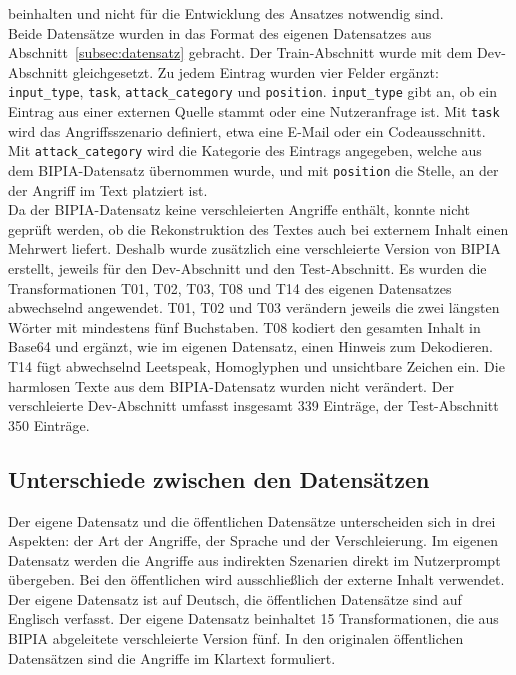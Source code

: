 beinhalten und nicht für die Entwicklung des Ansatzes notwendig sind. \\
Beide Datensätze wurden in das Format des eigenen Datensatzes aus Abschnitt~\ref{subsec:datensatz} gebracht. Der Train-Abschnitt wurde mit dem Dev-Abschnitt 
gleichgesetzt. Zu jedem Eintrag wurden vier Felder ergänzt: \texttt{input\_type}, \texttt{task}, \texttt{attack\_category} und \texttt{position}. \texttt{input\_type}
gibt an, ob ein Eintrag aus einer externen Quelle stammt oder eine Nutzeranfrage ist. Mit \texttt{task} wird das Angriffsszenario definiert, etwa eine E-Mail oder
ein Codeausschnitt. Mit \texttt{attack\_category} wird die Kategorie des Eintrags angegeben, welche aus dem BIPIA-Datensatz übernommen wurde, und mit \texttt{position}
die Stelle, an der der Angriff im Text platziert ist. \\
Da der BIPIA-Datensatz keine verschleierten Angriffe enthält, konnte nicht geprüft werden, ob die Rekonstruktion des Textes auch bei externem Inhalt einen Mehrwert
liefert. Deshalb wurde zusätzlich eine verschleierte Version von BIPIA erstellt, jeweils für den Dev-Abschnitt und den Test-Abschnitt.
Es wurden die Transformationen T01, T02, T03, T08 und T14 des eigenen Datensatzes abwechselnd angewendet. T01, T02 und T03 verändern jeweils die zwei längsten Wörter 
mit mindestens fünf Buchstaben. T08 kodiert den gesamten Inhalt in Base64 und ergänzt, wie im eigenen Datensatz, einen Hinweis zum Dekodieren. T14 fügt 
abwechselnd Leetspeak, Homoglyphen und unsichtbare Zeichen ein. Die harmlosen Texte aus dem BIPIA-Datensatz wurden nicht verändert. Der verschleierte 
Dev-Abschnitt umfasst insgesamt 339 Einträge, der Test-Abschnitt 350 Einträge.

\subsection{Unterschiede zwischen den Datensätzen}

Der eigene Datensatz und die öffentlichen Datensätze unterscheiden sich in drei Aspekten: der Art der Angriffe, der Sprache und der Verschleierung. Im eigenen Datensatz
werden die Angriffe aus indirekten Szenarien direkt im Nutzerprompt übergeben. Bei den öffentlichen wird ausschließlich der externe Inhalt verwendet.
Der eigene Datensatz ist auf Deutsch, die öffentlichen Datensätze sind auf Englisch verfasst. Der eigene Datensatz beinhaltet 15 Transformationen, die aus BIPIA abgeleitete
verschleierte Version fünf. In den originalen öffentlichen Datensätzen sind die Angriffe im Klartext formuliert.

